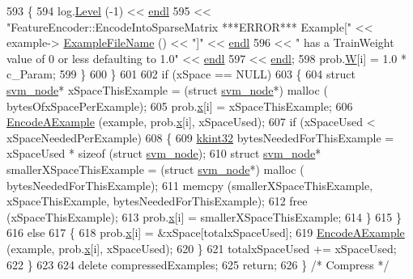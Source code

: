\begin{DoxyCode}
593       \{
594         log.\hyperlink{class_k_k_b_1_1_run_log_a32cf761d7f2e747465fd80533fdbb659}{Level} (-1) << \hyperlink{namespace_k_k_b_ad1f50f65af6adc8fa9e6f62d007818a8}{endl} 
595                        << \textcolor{stringliteral}{"FeatureEncoder::EncodeIntoSparseMatrix    ***ERROR***   Example["} << example->
      \hyperlink{class_k_k_m_l_l_1_1_feature_vector_ab47c89ab1e9396664fdc0dc34b6e1ab5}{ExampleFileName} () << \textcolor{stringliteral}{"]"} << \hyperlink{namespace_k_k_b_ad1f50f65af6adc8fa9e6f62d007818a8}{endl}
596                        << \textcolor{stringliteral}{"      has a TrainWeight value of 0 or less defaulting to 1.0"} << 
      \hyperlink{namespace_k_k_b_ad1f50f65af6adc8fa9e6f62d007818a8}{endl}
597                        << \hyperlink{namespace_k_k_b_ad1f50f65af6adc8fa9e6f62d007818a8}{endl};
598         prob.\hyperlink{struct_s_v_m233_1_1svm__problem_a499ec12b246a796ab0951be8dab5cec5}{W}[i] = 1.0 * c\_Param;
599       \}
600     \}
601 
602     \textcolor{keywordflow}{if}  (xSpace == NULL)
603     \{
604       \textcolor{keyword}{struct }\hyperlink{struct_s_v_m233_1_1svm__node}{svm\_node}*  xSpaceThisExample = (\textcolor{keyword}{struct }\hyperlink{struct_s_v_m233_1_1svm__node}{svm\_node}*) malloc (
      bytesOfxSpacePerExample);
605       prob.\hyperlink{struct_s_v_m233_1_1svm__problem_a79a6083544d0f446a643167950c7e285}{x}[i] = xSpaceThisExample;
606       \hyperlink{class_k_k_m_l_l_1_1_feature_encoder_af82278dec57d34f3ebcf6ea97cc625d2}{EncodeAExample} (example, prob.\hyperlink{struct_s_v_m233_1_1svm__problem_a79a6083544d0f446a643167950c7e285}{x}[i], xSpaceUsed);
607       \textcolor{keywordflow}{if}  (xSpaceUsed < xSpaceNeededPerExample)
608       \{
609         \hyperlink{namespace_k_k_b_a8fa4952cc84fda1de4bec1fbdd8d5b1b}{kkint32}  bytesNeededForThisExample = xSpaceUsed * \textcolor{keyword}{sizeof} (\textcolor{keyword}{struct }
      \hyperlink{struct_s_v_m233_1_1svm__node}{svm\_node});
610         \textcolor{keyword}{struct }\hyperlink{struct_s_v_m233_1_1svm__node}{svm\_node}*  smallerXSpaceThisExample = (\textcolor{keyword}{struct }\hyperlink{struct_s_v_m233_1_1svm__node}{svm\_node}*) malloc (
      bytesNeededForThisExample);
611         memcpy (smallerXSpaceThisExample, xSpaceThisExample, bytesNeededForThisExample);
612         free  (xSpaceThisExample);
613         prob.\hyperlink{struct_s_v_m233_1_1svm__problem_a79a6083544d0f446a643167950c7e285}{x}[i] = smallerXSpaceThisExample;
614       \}
615     \}
616     \textcolor{keywordflow}{else}
617     \{
618       prob.\hyperlink{struct_s_v_m233_1_1svm__problem_a79a6083544d0f446a643167950c7e285}{x}[i] = &xSpace[totalxSpaceUsed];
619       \hyperlink{class_k_k_m_l_l_1_1_feature_encoder_af82278dec57d34f3ebcf6ea97cc625d2}{EncodeAExample} (example, prob.\hyperlink{struct_s_v_m233_1_1svm__problem_a79a6083544d0f446a643167950c7e285}{x}[i], xSpaceUsed);
620     \}
621     totalxSpaceUsed += xSpaceUsed;
622   \}
623 
624   \textcolor{keyword}{delete}  compressedExamples;
625   \textcolor{keywordflow}{return};
626 \}  \textcolor{comment}{/* Compress */}
\end{DoxyCode}

